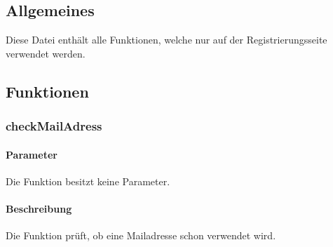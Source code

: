 \subsection{Allgemeines} Diese Datei enthält alle Funktionen, welche nur auf der Registrierungsseite verwendet werden.
\subsection{Funktionen}
\subsubsection{checkMailAdress}
\paragraph{Parameter} Die Funktion besitzt keine Parameter.
\paragraph{Beschreibung} Die Funktion prüft, ob eine Mailadresse schon verwendet wird.
